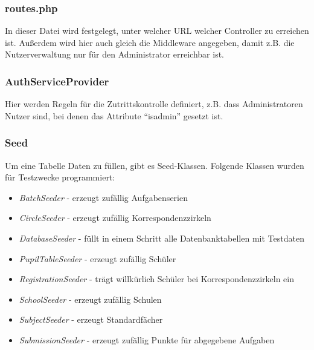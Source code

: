 \subsubsection{routes.php}

In dieser Datei wird festgelegt, unter welcher URL welcher Controller zu erreichen ist. Außerdem wird hier auch gleich die Middleware angegeben, damit z.B. die Nutzerverwaltung nur für den Administrator erreichbar ist.

\subsubsection{AuthServiceProvider}

Hier werden Regeln für die Zutrittskontrolle definiert, z.B. dass Administratoren Nutzer sind, bei denen das Attribute "`isadmin"' gesetzt ist.

\subsubsection{Seed}

Um eine Tabelle Daten zu füllen, gibt es Seed-Klassen. Folgende Klassen wurden für Testzwecke programmiert:

\begin{itemize}
	\item \textit{BatchSeeder} - erzeugt zufällig Aufgabenserien
	\item \textit{CircleSeeder} - erzeugt zufällig Korrespondenzzirkeln
	\item \textit{DatabaseSeeder} - füllt in einem Schritt alle Datenbanktabellen mit Testdaten
	\item \textit{PupilTableSeeder} - erzeugt zufällig Schüler
	\item \textit{RegistrationSeeder} - trägt willkürlich Schüler bei Korrespondenzzirkeln ein
	\item \textit{SchoolSeeder} - erzeugt zufällig Schulen
	\item \textit{SubjectSeeder} - erzeugt Standardfächer
	\item \textit{SubmissionSeeder} - erzeugt zufällig Punkte für abgegebene Aufgaben
\end{itemize}
